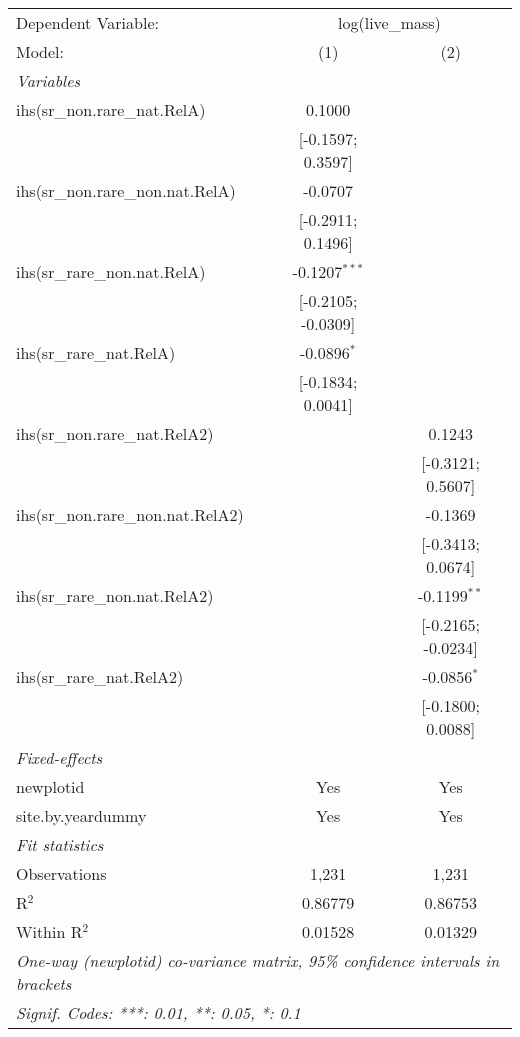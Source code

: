 \begin{tabular}{lcc}
\tabularnewline\midrule\midrule
Dependent Variable:&\multicolumn{2}{c}{log(live\_mass)}\\
Model:&(1) & (2)\\
\midrule \emph{Variables}&   &  \\
ihs(sr\_non.rare\_nat.RelA)&0.1000 &   \\
  &[-0.1597; 0.3597] &   \\
ihs(sr\_non.rare\_non.nat.RelA)&-0.0707 &   \\
  &[-0.2911; 0.1496] &   \\
ihs(sr\_rare\_non.nat.RelA)&-0.1207$^{***}$ &   \\
  &[-0.2105; -0.0309] &   \\
ihs(sr\_rare\_nat.RelA)&-0.0896$^{*}$ &   \\
  &[-0.1834; 0.0041] &   \\
ihs(sr\_non.rare\_nat.RelA2)&   & 0.1243\\
  &   & [-0.3121; 0.5607]\\
ihs(sr\_non.rare\_non.nat.RelA2)&   & -0.1369\\
  &   & [-0.3413; 0.0674]\\
ihs(sr\_rare\_non.nat.RelA2)&   & -0.1199$^{**}$\\
  &   & [-0.2165; -0.0234]\\
ihs(sr\_rare\_nat.RelA2)&   & -0.0856$^{*}$\\
  &   & [-0.1800; 0.0088]\\
\midrule \emph{Fixed-effects}&   &  \\
newplotid & Yes & Yes\\
site.by.yeardummy & Yes & Yes\\
\midrule \emph{Fit statistics}&  & \\
Observations & 1,231&1,231\\
R$^2$ & 0.86779&0.86753\\
Within R$^2$ & 0.01528&0.01329\\
\midrule\midrule\multicolumn{3}{l}{\emph{One-way (newplotid) co-variance matrix, 95\% confidence intervals in brackets}}\\
\multicolumn{3}{l}{\emph{Signif. Codes: ***: 0.01, **: 0.05, *: 0.1}}\\
\end{tabular}


